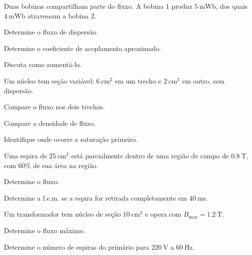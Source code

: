 \begin{questao}[3]{}

Duas bobinas compartilham parte do fluxo. A bobina $1$ produz
$\SI{5}{\milli\weber}$, dos quais $\SI{4}{\milli\weber}$ atravessam a bobina
$2$.
\begin{itensq}
\item Determine o fluxo de dispersão.
\item Determine o coeficiente de acoplamento aproximado.
\item Discuta como aumentá-lo.
\end{itensq}


\end{questao}
\begin{questao}[3]{}

Um núcleo tem seção variável: $\SI{6}{\centi\meter\squared}$ em um trecho e
$\SI{2}{\centi\meter\squared}$ em outro, sem dispersão.
\begin{itensq}
\item Compare o fluxo nos dois trechos.
\item Compare a densidade de fluxo.
\item Identifique onde ocorre a saturação primeiro.
\end{itensq}


\end{questao}
\begin{questao}[3]{}

Uma espira de $\SI{25}{\centi\meter\squared}$ está parcialmente dentro de uma
região de campo de $\SI{0.8}{\tesla}$, com $60\%$ de sua área na região.
\begin{itensq}
\item Determine o fluxo.
\item Determine a f.e.m. se a espira for retirada completamente em
      $\SI{40}{\milli\second}$.
\end{itensq}


\end{questao}
\begin{questao}[3]{}

Um transformador tem núcleo de seção $\SI{10}{\centi\meter\squared}$ e opera
com $B_{\max}=\SI{1.2}{\tesla}$.
\begin{itensq}
\item Determine o fluxo máximo.
\item Determine o número de espiras do primário para
      $\SI{220}{\volt}$ a $\SI{60}{\hertz}$.
\end{itensq}


\end{questao}

